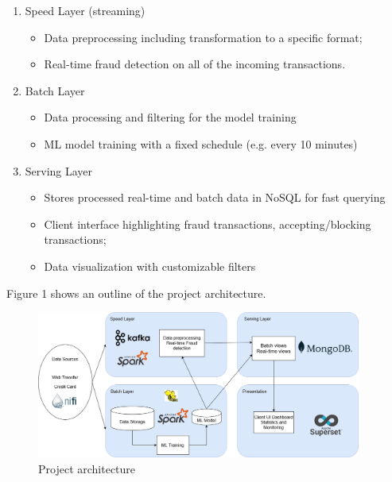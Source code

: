 \documentclass[12pt,a4paper, hidelinks]{article}
\begin{document}
\begin{enumerate}
    \item Speed Layer (streaming)
        \begin{itemize}
            \item Data preprocessing including transformation to a specific format;
            \item Real-time fraud detection on all of the incoming transactions.
        \end{itemize}
    \item Batch Layer
        \begin{itemize}
            \item Data processing and filtering for the model training
            \item ML model training with a fixed schedule (e.g. every 10 minutes)
        \end{itemize}
    \item Serving Layer
        \begin{itemize}
            \item Stores processed real-time and batch data in NoSQL for fast querying
            \item Client interface highlighting fraud transactions, accepting/blocking transactions;
            \item Data visualization with customizable filters
        \end{itemize}
\end{enumerate}

Figure 1 shows an outline of the project architecture.

\begin{figure}[htbp]
    \centering
    \includegraphics[width=0.95\textwidth]{images/Architecture-M2.png}
    \caption{Project architecture}
    \label{fig:sunset}
\end{figure}
\end{document}
